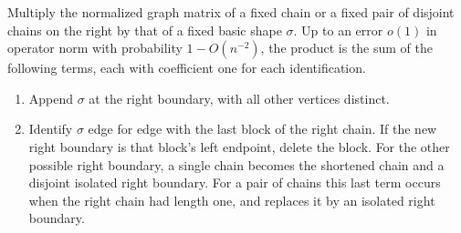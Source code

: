 \documentclass[preprints,article,submit,oneauthor]{Definitions/mdpi}
\begin{document}
\begin{Lemma}\label{lem:product}
Multiply the normalized graph matrix of a fixed chain or a fixed pair
of disjoint chains on the right by that of a fixed basic shape
\(\sigma\). Up to an error \(o(1)\) in operator norm with probability
\(1-O(n^{-2})\), the product is the sum of the following terms, each
with coefficient one for each identification.
\begin{enumerate}
\item Append \(\sigma\) at the right boundary, with all other vertices
      distinct.
\item Identify \(\sigma\) edge for edge with the last block of the right
      chain. If the new right boundary is that block's left endpoint,
      delete the block. For the other possible right boundary, a
      single chain becomes the shortened chain and a disjoint isolated
      right boundary. For a pair of chains this last term occurs when
      the right chain had length one, and replaces it by an isolated
      right boundary.
\end{enumerate}
\end{Lemma}
\end{document}
